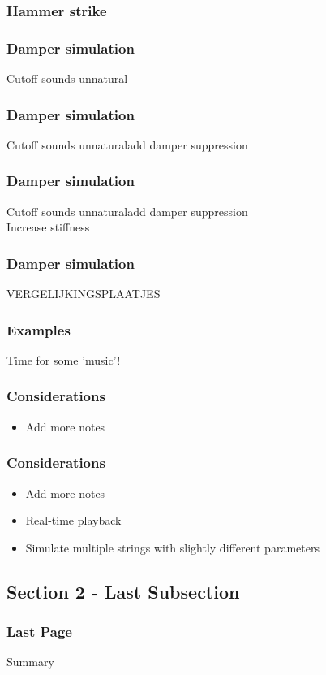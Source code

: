 \documentclass{beamer}
\begin{document}
\begin{frame}\frametitle{Hammer strike}

\end{frame}



\begin{frame}\frametitle{Damper simulation}
Cutoff sounds unnatural
\end{frame}

\begin{frame}\frametitle{Damper simulation}
Cutoff sounds unnatural\rightarrow add damper suppression
\end{frame}

\begin{frame}\frametitle{Damper simulation}
Cutoff sounds unnatural\rightarrow add damper suppression\\
Increase stiffness
\end{frame}

\begin{frame}\frametitle{Damper simulation}
VERGELIJKINGSPLAATJES
\end{frame}



\begin{frame}\frametitle{Examples}
Time for some 'music'!
\end{frame}

\begin{frame}\frametitle{Considerations}
\begin{itemize}
\item Add more notes
\end{itemize}
\end{frame}

\begin{frame}\frametitle{Considerations}
\begin{itemize}
\item Add more notes
\item Real-time playback
\item Simulate multiple strings with slightly different parameters
\end{itemize}
\end{frame}

\subsection[]{Section 2 - Last Subsection}

\begin{frame}\frametitle{Last Page}
	\begin{block}{Summary}
	\end{block}
\end{frame}
\end{document}
